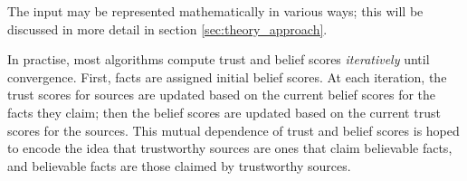 \documentclass[../main.tex]{subfiles}
\begin{document}

The input may be represented mathematically in various ways; this will be
discussed in more detail in section \ref{sec:theory_approach}. 

In practise, most algorithms compute trust and belief scores \emph{iteratively}
until convergence. First, facts are assigned initial belief scores. At each
iteration, the trust scores for sources are updated based on the current belief
scores for the facts they claim; then the belief scores are updated based on the
current trust scores for the sources. This mutual dependence of trust and
belief scores is hoped to encode the idea that trustworthy sources are ones
that claim believable facts, and believable facts are those claimed by
trustworthy sources.
\end{document}
